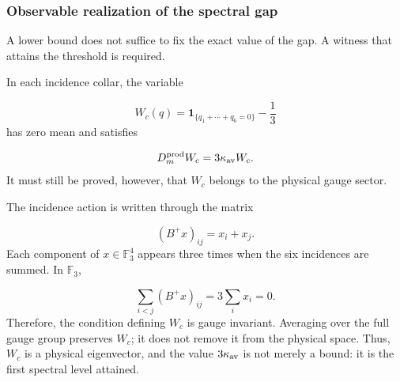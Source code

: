 \subsubsection{Observable realization of the spectral gap}
A lower bound does not suffice to fix the exact value of the gap. A witness that attains the threshold is required.\par
In each incidence collar, the variable\par
\[
W_c(q)
=
\mathbf1_{\{q_1+\cdots+q_6=0\}}
-\frac13
\]
has zero mean and satisfies\par
\[
D_m^{\rm prod}W_c
=
3\kappa_{\rm av}W_c.
\]
It must still be proved, however, that \(W_c\) belongs to the physical gauge sector.\par
The incidence action is written through the matrix\par
\[
(B^+x)_{ij}=x_i+x_j.
\]
Each component of \(x\in\mathbb F_3^4\) appears three times when the six incidences are summed. In \(\mathbb F_3\),\par
\[
\sum_{i<j}(B^+x)_{ij}
=
3\sum_i x_i
=
0.
\]
Therefore, the condition defining \(W_c\) is gauge invariant. Averaging over the full gauge group preserves \(W_c\); it does not remove it from the physical space. Thus, \(W_c\) is a physical eigenvector, and the value \(3\kappa_{\rm av}\) is not merely a bound: it is the first spectral level attained.\par
{}

